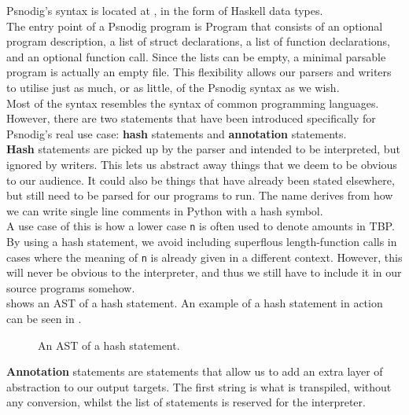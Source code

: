 Psnodig's syntax is located at , in the form of Haskell data types. \\

The entry point of a Psnodig program is Program that consists of an optional program description, a list of struct declarations, a list of function declarations, and an optional function call. Since the lists can be empty, a minimal parsable program is actually an empty file. This flexibility allows our parsers and writers to utilise just as much, or as little, of the Psnodig syntax as we wish. \\

Most of the syntax resembles the syntax of common programming languages. However, there are two statements that have been introduced specifically for Psnodig's real use case: \textbf{hash} statements and \textbf{annotation} statements. \\

\textbf{Hash} statements are picked up by the parser and intended to be interpreted, but ignored by writers. This lets us abstract away things that we deem to be obvious to our audience. It could also be things that have already been stated elsewhere, but still need to be parsed for our programs to run. The name derives from how we can write single line comments in Python with a hash symbol. \\

A use case of this is how a lower case \texttt{n} is often used to denote amounts in TBP. By using a hash statement, we avoid including superflous length-function calls in cases where the meaning of \texttt{n} is already given in a different context. However, this will never be obvious to the interpreter, and thus we still have to include it in our source programs somehow. \\

 shows an AST of a hash statement. An example of a hash statement in action can be seen in . \\

\begin{figure}[ht!]
    \caption{An AST of a hash statement.}
    \label{An AST of a hash statement.}
\end{figure}

\textbf{Annotation} statements are statements that allow us to add an extra layer of abstraction to our output targets. The first string is what is transpiled, without any conversion, whilst the list of statements is reserved for the interpreter. \\

